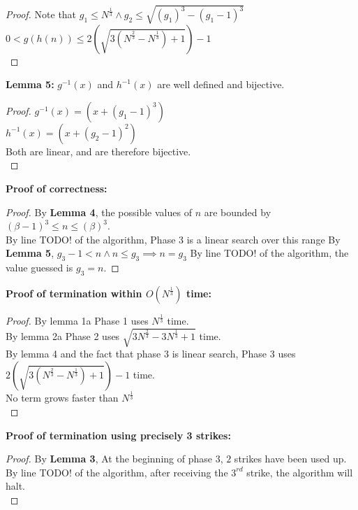 \begin{problem}
\begin{proof}
    Note that $g_1 \leq N^{\frac{1}{3}} \land g_2 \leq \sqrt{(g_1)^3 - (g_1 - 1)^3}$ \\
    $0 < g(h(n)) \leq 2(\sqrt{3(N^{\frac{2}{3}} - N^{\frac{1}{3}}) + 1}) - 1$ \\
  \end{proof}
  \textbf{Lemma 5:} $g^{-1}(x)$ and $h^{-1}(x)$ are well defined and bijective.
  \begin{proof}
    $g^{-1}(x) = (x + (g_1 - 1)^3)$ \\
    $h^{-1}(x) = (x + (g_2 - 1)^2)$ \\
    Both are linear, and are therefore bijective. \\
  \end{proof}
  \textbf{Proof of correctness:}
  \begin{proof}
  By \textbf{Lemma 4}, the possible values of $n$ are bounded by $(\beta - 1)^3 \leq n \leq (\beta)^3$. \\
  By line TODO! of the algorithm, Phase 3 is a linear search over this range
  By \textbf{Lemma 5}, $g_3 - 1 < n \land n \leq g_3 \implies n = g_3$
  By line TODO! of the algorithm, the value guessed is $g_3 = n$.
  \end{proof}
  \textbf{Proof of termination within $O(N^{\frac{1}{3}})$ time:}
  \begin{proof}
    By lemma 1a Phase 1 uses $N^{\frac{1}{3}}$ time. \\
    By lemma 2a Phase 2 uses $\sqrt{3N^{\frac{2}{3}} - 3N^{\frac{1}{3}} + 1}$ time. \\
    By lemma 4 and the fact that phase 3 is linear search, Phase 3 uses $2(\sqrt{3(N^{\frac{2}{3}} - N^{\frac{1}{3}}) + 1}) - 1$ time. \\
    No term grows faster than $N^{\frac{1}{3}}$ \\
  \end{proof}
  \textbf{Proof of termination using precisely 3 strikes:}
  \begin{proof}
    By \textbf{Lemma 3}, At the beginning of phase 3, $2$ strikes have been used up. \\
    By line TODO! of the algorithm, after receiving the $3^{rd}$ strike, the algorithm will halt. \\
  \end{proof}
\end{problem}
